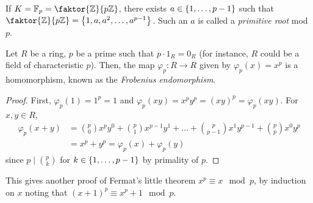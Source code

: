 \begin{remark}
	If \( K = \mathbb F_p = \faktor{\mathbb Z}{p\mathbb Z} \), there exists \( a \in \qty{1, \dots, p-1} \) such that \( \faktor{\mathbb Z}{p\mathbb Z} = \qty{1, a, a^2, \dots, a^{p-1}} \).
	Such an \( a \) is called a \emph{primitive root} mod \( p \).
\end{remark}
\begin{proposition}
	Let \( R \) be a ring, \( p \) be a prime such that \( p \cdot 1_R = 0_R \) (for instance, \( R \) could be a field of characteristic \( p \)).
	Then, the map \( \varphi_p \colon R \to R \) given by \( \varphi_p(x) = x^p \) is a homomorphism, known as the \emph{Frobenius endomorphism}.
\end{proposition}
\begin{proof}
	First, \( \varphi_p(1) = 1^p = 1 \) and \( \varphi_p(xy) = x^p y^p = (xy)^p = \varphi_p(xy) \).
	For \( x,y \in R \),
	\begin{align*}
		\varphi_p(x + y) &= \binom p 0 x^p y^0 + \binom p 1 x^{p-1} y^1 + \dots + \binom p {p-1} x^1 y^{p-1} + \binom p p x^0 y^p \\
		&= x^p + y^p = \varphi_p(x) + \varphi_p(y)
	\end{align*}
	since \( p \mid \binom p k \) for \( k \in \qty{1, \dots, p-1} \) by primality of \( p \).
\end{proof}
\begin{example}
	This gives another proof of Fermat's little theorem \( x^p \equiv x \mod p \), by induction on \( x \) noting that \( (x+1)^p \equiv x^p + 1 \mod p \).
\end{example}
